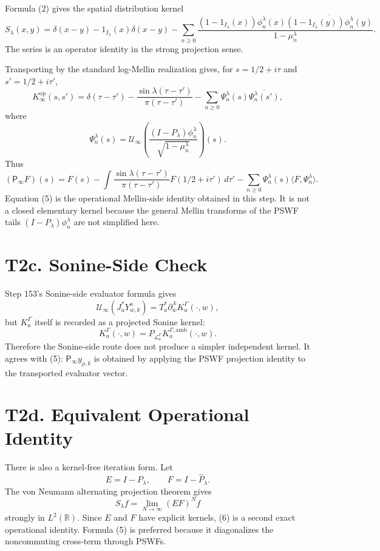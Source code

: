 \documentclass[11pt]{article}
\newcommand{\Psym}{\mathsf P_\infty}
\newcommand{\Uinf}{\mathcal U_\infty}
\begin{document}
Formula (2) gives the spatial distribution kernel
\[
\boxed{
S_\lambda(x,y)
=
\delta(x-y)
-1_{I_\lambda}(x)\delta(x-y)
-
\sum_{n\ge0}
\frac{(1-1_{I_\lambda}(x))\phi_n^\lambda(x)
      \overline{(1-1_{I_\lambda}(y))\phi_n^\lambda(y)}}
     {1-\mu_n^\lambda}.
}
\tag{3}
\]
The series is an operator identity in the strong projection sense.

Transporting by the standard log-Mellin realization gives, for
\(s=1/2+i\tau\) and \(s'=1/2+i\tau'\),
\[
\boxed{
K_\infty^{\mathrm{op}}(s,s')
=
\delta(\tau-\tau')
-
\frac{\sin \lambda(\tau-\tau')}{\pi(\tau-\tau')}
-
\sum_{n\ge0}\Psi_n^\lambda(s)\overline{\Psi_n^\lambda(s')},
}
\tag{4}
\]
where
\[
\Psi_n^\lambda(s)
=
\Uinf\left(\frac{(I-P_\lambda)\phi_n^\lambda}
{\sqrt{1-\mu_n^\lambda}}\right)(s).
\]
Thus
\[
\boxed{
(\Psym F)(s)
=
F(s)
-
\int \frac{\sin \lambda(\tau-\tau')}{\pi(\tau-\tau')}
F(1/2+i\tau')\,d\tau'
-
\sum_{n\ge0}\Psi_n^\lambda(s)
\langle F,\Psi_n^\lambda\rangle .
}
\tag{5}
\]
Equation (5) is the operational Mellin-side identity obtained in this step.
It is not a closed elementary kernel because the general Mellin transforms of
the PSWF tails \((I-P_\lambda)\phi_n^\lambda\) are not simplified here.

\section{T2c. Sonine-Side Check}

Step 153's Sonine-side evaluator formula gives
\[
\Uinf(J_a^*Y^a_{w,k})
=
T_a^*\partial_{\overline w}^{\,k}K_a^\Gamma(\cdot,w),
\]
but \(K_a^\Gamma\) itself is recorded as a projected Sonine kernel:
\[
K_a^\Gamma(\cdot,w)
=
P_{\mathcal L_a^\Gamma}K_a^{\Gamma,\mathrm{amb}}(\cdot,w).
\]
Therefore the Sonine-side route does not produce a simpler independent
kernel.  It agrees with (5): \(\Psym y_{\rho,k}\) is obtained by applying the
PSWF projection identity to the transported evaluator vector.

\section{T2d. Equivalent Operational Identity}

There is also a kernel-free iteration form.  Let
\[
E=I-P_\lambda,\qquad F=I-\widehat P_\lambda.
\]
The von Neumann alternating projection theorem gives
\[
\boxed{
S_\lambda f
=
\lim_{N\to\infty}(EF)^Nf
}
\tag{6}
\]
strongly in \(L^2(\mathbb R)\).  Since \(E\) and \(F\) have explicit kernels,
(6) is a second exact operational identity.  Formula (5) is preferred because
it diagonalizes the noncommuting cross-term through PSWFs.
\end{document}
